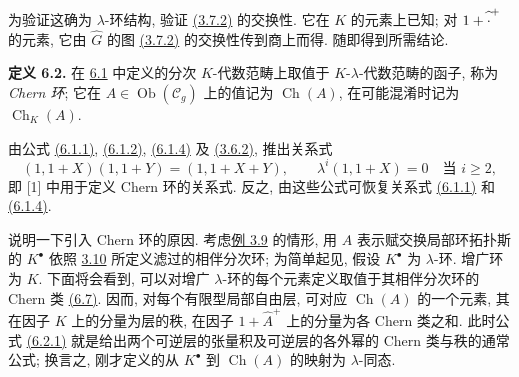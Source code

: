 为验证这确为 \(\lambda\)-环结构, 验证 \hyperlink{sga6.e05.eq.3-7-2}{(3.7.2)} 的交换性. 它在 \(K\) 的元素上已知; 对 \(1+\widehat{\vphantom A\cdot}^{+}\) 的元素, 它由 \(\widehat G\) 的图 \hyperlink{sga6.e05.eq.3-7-2}{(3.7.2)} 的交换性传到商上而得. 随即得到所需结论.

\providecommand{\Ghat}{\widehat G}
\providecommand{\Aqhat}{\widehat A_{\mathbb Q}}
\providecommand{\Ch}{\operatorname{Ch}}
\providecommand{\Log}{\operatorname{Log}}
\providecommand{\id}{\operatorname{id}}
\providecommand{\gr}{\operatorname{gr}}
\providecommand{\Hom}{\operatorname{Hom}}
\providecommand{\epsi}{\varepsilon}
\providecommand{\clgr}{\operatorname{cl}}
\providecommand{\Fil}{\operatorname{Fil}}
\providecommand{\Gr}{\operatorname{Gr}}
\providecommand{\Sym}{\operatorname{Sym}}



\textbf{定义 6.2.} 在 \hyperlink{sga6.e05.para.6-1}{6.1} 中定义的分次 \(K\)-代数范畴上取值于 \(K\)-\(\lambda\)-代数范畴的函子, 称为 \emph{Chern 环}; 它在 \(A\in\operatorname{Ob}(\mathscr C_g)\) 上的值记为 \(\Ch(A)\), 在可能混淆时记为 \(\Ch_K(A)\).

由公式 \hyperlink{sga6.e05.eq.6-1-1}{(6.1.1)}, \hyperlink{sga6.e05.eq.6-1-2}{(6.1.2)}, \hyperlink{sga6.e05.eq.6-1-4}{(6.1.4)} 及 \hyperlink{sga6.e05.eq.3-6-2}{(3.6.2)}, 推出关系式
\begin{equation}\tag{6.2.1}
 (1,1+X)(1,1+Y)=(1,1+X+Y),
 \qquad
 \lambda^i(1,1+X)=0\quad\text{当 }i\ge2,
\end{equation}
即 [1] 中用于定义 Chern 环的关系式. 反之, 由这些公式可恢复关系式 \hyperlink{sga6.e05.eq.6-1-1}{(6.1.1)} 和 \hyperlink{sga6.e05.eq.6-1-4}{(6.1.4)}.

说明一下引入 Chern 环的原因. 考虑\hyperlink{sga6.e05.ex.3-9-1}{例 3.9} 的情形, 用 \(A\) 表示赋交换局部环拓扑斯的 \(K^\bullet\) 依照 \hyperlink{sga6.e05.para.3-10}{3.10} 所定义滤过的相伴分次环; 为简单起见, 假设 \(K^\bullet\) 为 \(\lambda\)-环. 增广环为 \(K\). 下面将会看到, 可以对增广 \(\lambda\)-环的每个元素定义取值于其相伴分次环的 Chern 类 \hyperlink{sga6.e05.para.6-7}{(6.7)}. 因而, 对每个有限型局部自由层, 可对应 \(\Ch(A)\) 的一个元素, 其在因子 \(K\) 上的分量为层的秩, 在因子 \(1+\widehat A^+\) 上的分量为各 Chern 类之和. 此时公式 \hyperlink{sga6.e05.eq.6-2-1}{(6.2.1)} 就是给出两个可逆层的张量积及可逆层的各外幂的 Chern 类与秩的通常公式; 换言之, 刚才定义的从 \(K^\bullet\) 到 \(\Ch(A)\) 的映射为 \(\lambda\)-同态.

